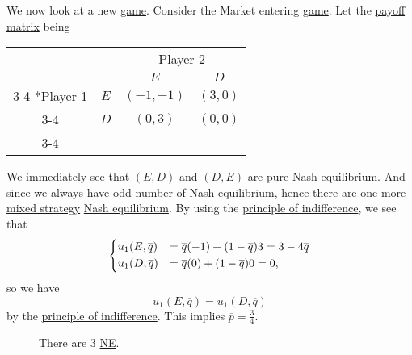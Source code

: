 \begin{eg}\label{eg:market-entering}
	We now look at a new \hyperref[def:game]{game}. Consider the Market entering \hyperref[def:game]{game}. Let the \hyperref[def:payoff-matrix]{payoff matrix} being
	\begin{table}[H]
		\centering
		\setlength{\extrarowheight}{2pt}
		\begin{tabular}{cc|c|c|}
			                                               & \multicolumn{1}{c}{} & \multicolumn{2}{c}{\hyperref[def:player]{Player} 2}                           \\
			                                               & \multicolumn{1}{c}{} & \multicolumn{1}{c}{$E$}                             & \multicolumn{1}{c}{$D$} \\\cline{3-4}
			\multirow{2}*{\hyperref[def:player]{Player} 1} & $E$                  & $(-1, -1)$                                          & $(3, 0)$                \\\cline{3-4}
			                                               & $D$                  & $(0, 3)$                                            & $(0, 0)$                \\\cline{3-4}
		\end{tabular}
	\end{table}
	We immediately see that \((E, D)\) and \((D, E)\) are \hyperref[def:pure-strategy]{pure} \hyperref[def:Nash-equilibrium]{Nash equilibrium}. And since we always have odd number of \hyperref[def:Nash-equilibrium]{Nash equilibrium}, hence there are one more \hyperref[def:mixed-strategy]{mixed strategy} \hyperref[def:Nash-equilibrium]{Nash equilibrium}. By using the \hyperref[thm:principle-of-indifference]{principle of indifference}, we see that
	\[
		\begin{dcases}
			u_1(E, \overline{q}) & = \overline{q}( - 1)+(1-\overline{q})3 = 3 - 4 \overline{q} \\
			u_1(D, \overline{q}) & = \overline{q}(0)+(1 - \overline{q})0 = 0,
		\end{dcases}
	\]
	so we have
	\[
		u_1(E, \overline{q}) = u_1(D, \overline{q})
	\]
	by the \hyperref[thm:principle-of-indifference]{principle of indifference}. This implies \(\overline{p} = \frac{3}{4}\).
	\begin{figure}[H]
		\centering
		\caption{There are \(3\) \hyperref[def:Nash-equilibrium]{NE}.}
		\label{fig:NE-market-entering}
	\end{figure}
\end{eg}